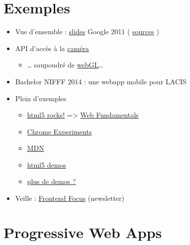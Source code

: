 \hypertarget{exemples}{%
\section{Exemples}\label{exemples}}

\begin{itemize}
\tightlist
\item
  Vue d'ensemble :
  \href{http://web.archive.org/web/20150525080904/http://slides.html5rocks.com/\#landing-slide}{slides}
  Google 2011 (
  \href{https://github.com/html5rocks/slides.html5rocks.com}{sources} )
\item
  API d'accès à la
  \href{http://www.soundstep.com/blog/experiments/jsdetection/}{caméra}

  \begin{itemize}
  \tightlist
  \item
    \ldots{} saupoudré de
    \href{http://auduno.github.io/clmtrackr/examples/facesubstitution.html}{webGL}\ldots{}
  \end{itemize}
\item
  Bachelor NIFFF 2014 : une webapp mobile pour LACIS
\item
  Plein d'exemples

  \begin{itemize}
  \tightlist
  \item
    \href{http://www.html5rocks.com/}{html5 rocks!} =\textgreater{}
    \href{https://developers.google.com/web/}{Web Fundamentals}
  \item
    \href{http://www.chromeexperiments.com/}{Chrome Experiments}
  \item
    \href{https://developer.mozilla.org/en-US/demos/tag/tech:html5}{MDN}
  \item
    \href{http://html5demos.com/}{html5 demos}
  \item
    \href{http://bit.ly/VJaqjb}{plus de demos ?}
  \end{itemize}
\item
  Veille : \href{http://html5weekly.com/}{Frontend Focus} (newsletter)
\end{itemize}

\hypertarget{progressive-web-apps}{%
\section{Progressive Web Apps}\label{progressive-web-apps}}

